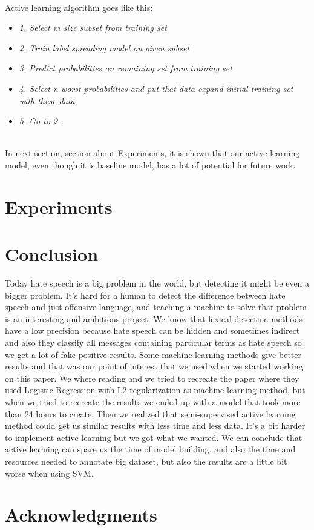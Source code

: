 \documentclass[10pt, a4paper]{article}
\begin{document}
\\Active learning algorithm goes like this:
\begin{itemize}
	\item \textit{1. Select m size subset from training set}
	\item \textit{2. Train label spreading model on given subset}
	\item \textit{3. Predict probabilities on remaining set from training set}
	\item \textit{4. Select n worst probabilities and put that data expand initial training set with these data}
	\item \textit{5. Go to 2.}
\end{itemize}

\\In next section, section about Experiments, it is shown that our active learning model, even though it is baseline model, has a lot of potential for future work.
\section{Experiments}
\section{Conclusion}
Today hate speech is a big problem in the world, but detecting it might be even a bigger problem. It's hard for a human to detect the difference between hate speech and just offensive language, and teaching a machine to solve that problem is an interesting and ambitious project. We know that lexical detection methods have a low precision because hate speech can be hidden and sometimes indirect and also they classify all messages containing particular terms as hate speech so we get a lot of fake positive results. Some machine learning methods give better results and that was our point of interest that we used when we started working on this paper.
We where reading and we tried to recreate the paper \cite{Davidson2017AutomatedHS} where they used Logistic Regression with L2 regularization as machine learning method, but when we tried to recreate the results we ended up with a model that took more than 24 hours to create. Then we realized that semi-supervised active learning method could get us similar results with less time and less data. It's a bit harder to implement active learning but we got what we wanted. We can conclude that active learning can spare us the time of model building, and also the time and resources needed to annotate big dataset, but also the results are a little bit worse when using SVM.

\section{Acknowledgments}

 
\end{document}
